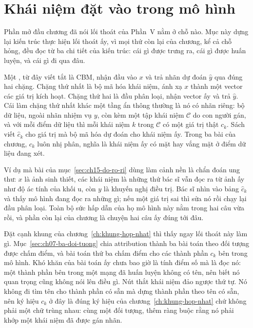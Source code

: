 \section{Khái niệm đặt vào trong mô hình}
\label{sec:ch15-khai-niem-trong-mo-hinh}

%
Phần mở đầu chương đã nói lối thoát của Phần~V nằm ở chỗ nào. Mục này dựng lại
kiến trúc thực hiện lối thoát ấy, vì mọi thứ còn lại của chương, kể cả chỗ hỏng,
đều đọc từ ba chi tiết của kiến trúc: cái gì được trưng ra, cái gì được huấn
luyện, và cái gì đi qua đâu.

Một , từ đây viết tắt
là CBM, nhận đầu vào $x$ và trả nhãn dự đoán $\hat y$ qua đúng hai chặng. Chặng thứ nhất là bộ mã hóa khái niệm, ánh xạ $x$ thành một vector
các giá trị kích hoạt. Chặng thứ hai là đầu phân loại, nhận vector ấy và trả
$\hat y$. Cái làm chặng thứ nhất khác một tầng ẩn thông thường là nó có nhãn
riêng: bộ dữ liệu, ngoài nhãn nhiệm vụ $y$, còn kèm một tập khái niệm $\mathcal{C}$
do con người gán, và với mỗi điểm dữ liệu thì mỗi khái niệm $k$ trong $\mathcal{C}$
có một giá trị thật $c_k$. Sách viết $\hat c_k$ cho giá trị mà bộ mã hóa dự đoán
cho khái niệm ấy. Trong ba bài của chương, $c_k$ luôn nhị phân, nghĩa là khái
niệm ấy có mặt hay vắng mặt ở điểm dữ liệu đang xét.

%
Ví dụ mà bài của mục~\ref{sec:ch15-do-ro-ri} dùng làm cảnh nền là chẩn đoán ung
thư: $x$ là ảnh sinh thiết, các khái niệm là những thứ bác sĩ vẫn đọc ra từ ảnh
ấy như độ ác tính của khối u, còn $y$ là khuyến nghị điều trị. Bác sĩ nhìn vào
bảng $\hat c_k$ và thấy mô hình đang đọc ra những gì; nếu một giá trị sai thì sửa
nó rồi chạy lại đầu phân loại. Toàn bộ sức hấp dẫn của họ mô hình này nằm trong
hai câu vừa rồi, và phần còn lại của chương là chuyện hai câu ấy đúng tới đâu.

%
Đặt cạnh khung của chương~\ref{ch:khung-hop-nhat} thì thấy ngay lối thoát này
làm gì. Mục~\ref{sec:ch07-ba-doi-tuong} chia attribution thành ba bài toán theo
đối tượng được chấm điểm, và bài toán thứ ba chấm điểm cho các thành phần $c_k$
bên trong mô hình. Khó khăn của bài toán ấy chưa bao giờ là tính điểm số mà là
đọc nó: một thành phần bên trong một mạng đã huấn luyện không có tên, nên biết
nó quan trọng cũng không nói lên điều gì. Nút thắt khái niệm đảo ngược thứ tự.
Nó không đi tìm tên cho thành phần có sẵn mà dựng thành phần theo tên có sẵn,
nên ký hiệu $c_k$ ở đây là đúng ký hiệu của chương~\ref{ch:khung-hop-nhat} chứ
không phải một chữ trùng nhau: cùng một đối tượng, thêm ràng buộc rằng nó phải
khớp một khái niệm đã được gán nhãn.

